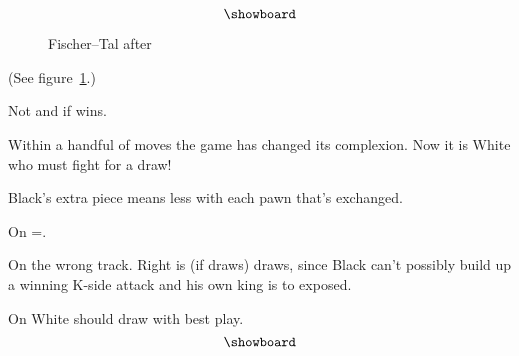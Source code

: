\documentclass[11pt,twocolumn]{article}
\begin{document}
\begin{figure}[htbp]
  \begin{center}
    $$\showboard$$
    \caption{Fischer--Tal after 
      \protect{}}
    \label{fig:after-25...Kf8}
  \end{center}
\end{figure}


(See figure~\ref{fig:after-25...Kf8}.)


Not 
and if 
wins. 


Within a handful of moves the game
has changed its complexion. Now it
is White who must fight for a draw!

Black's extra piece means less with
each pawn that's exchanged.

On =.


On the wrong track. Right is
 (if 
 draws) 
 draws, 
since Black can't possibly build up a
winning K-side attack and his own
king is to exposed.

On  
White should draw with best play.
$$\showboard$$
\end{document}
